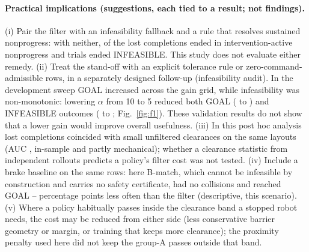 \documentclass[journal]{IEEEtran}
\begin{document}
\paragraph{Practical implications (suggestions, each tied to a result; not findings).}
(i) Pair the filter with an infeasibility fallback and a rule that resolves sustained nonprogress:
with neither, \LostFIAll{} of the \LostTotalAll{} lost completions ended in intervention-active
nonprogress and \InfTotal{}
trials ended INFEASIBLE. This study does not evaluate either remedy.
(ii) Treat the stand-off with an explicit tolerance rule or zero-command-admissible rows, in a
separately designed follow-up (infeasibility audit). In the development sweep GOAL increased across the
gain grid, while infeasibility was non-monotonic: lowering $\alpha$ from 10 to 5 reduced both GOAL
(\SelGoalten{} to \SelGoalfive) and INFEASIBLE outcomes (\SelInften{} to \SelInffive; Fig.~\ref{fig:f1}).
These validation results do not show that a lower gain would improve overall usefulness.
(iii) In this post hoc analysis lost completions coincided with small unfiltered clearances on the same
layouts (AUC \AucPooled, in-sample and partly mechanical); whether a clearance statistic from
independent rollouts predicts a policy's filter cost was not tested.
(iv) Include a brake baseline on the same rows: here B-match, which cannot be infeasible by construction
and carries no safety certificate, had no collisions and reached GOAL
\OnBmGoalMin--\OnBmGoalMax{} percentage points less often than the filter (descriptive, this scenario).
(v) Where a policy habitually passes inside the clearance band a stopped robot needs, the cost may be
reduced from either side (less conservative barrier geometry or margin, or training that keeps more
clearance); the proximity penalty used here did not keep the group-A passes outside that band.
\end{document}
